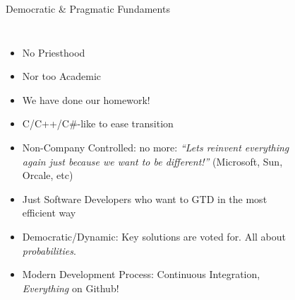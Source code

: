 \documentclass[xcolor=dvipsnames]{beamer}
\begin{document}
\begin{frame}[fragile]{Democratic \& Pragmatic Fundaments}
    \begin{columns}[c] %
      \begin{itemize}[<+->]
      \item No Priesthood
      \item Nor too Academic
      \item We have done our homework!
      \item C/C++/C\#-like to ease transition
      \item Non-Company Controlled: no more: \textit{``Lets reinvent everything again just
        because we want to be different!''} (Microsoft, Sun, Orcale, etc)
      \item Just Software Developers who want to GTD in the most efficient way
      \item Democratic/Dynamic: Key solutions are voted for. All about
        \emph{probabilities}.
      \item Modern Development Process: Continuous Integration, \emph{Everything} on Github!
      \end{itemize}
      \begin{figure}
      \end{figure}
    \end{columns}
\end{frame}
\end{document}

